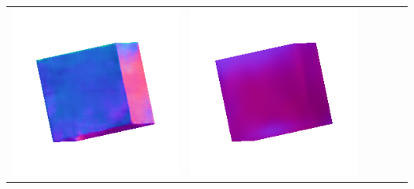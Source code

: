 \begin{center}
\begin{tabularx}{\linewidth}{@{}Y@{}Y@{}Y@{}Y@{}Y@{}Y@{}}
\includegraphics[width=\linewidth]{semisynthetic/20150514_0_marrnet_out.png} &
\includegraphics[width=\linewidth]{semisynthetic/20150514_0_ef_out.png} \\

\end{tabularx}
\end{center}
